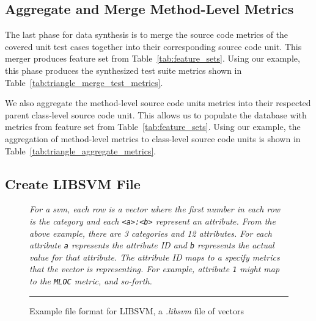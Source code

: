 \subsection{Aggregate and Merge Method-Level Metrics}
\label{subsec:approach_aggregate_merge_metrics}
The last phase for data synthesis is to merge the source code metrics of the covered unit test cases together into their corresponding source code unit. This merger produces feature set  from Table~\ref{tab:feature_sets}. Using our example, this phase produces the synthesized test suite metrics shown in Table~\ref{tab:triangle_merge_test_metrics}.

We also aggregate the method-level source code units metrics into their respected parent class-level source code unit. This allows us to populate the database with metrics from feature set  from Table~\ref{tab:feature_sets}. Using our example, the aggregation of method-level metrics to class-level source code units is shown in Table~\ref{tab:triangle_aggregate_metrics}.


\subsection{Create LIBSVM File}
\label{subsec:approach_create_libsvm_file}
\begin{figure}[!tb]
  \centering
  \begin{minipage}{9.5cm}
    
  \end{minipage}
  \caption{Example file format for LIBSVM, a \emph{.libsvm} file of vectors}
  \vspace{1mm}
  \footnotesize{\emph{For a \gls{svm}, each row is a vector where the first number in each row is the category and each \texttt{<a>:<b>} represent an attribute. From the above example, there are 3 categories and 12 attributes. For each attribute \texttt{a} represents the attribute ID and \texttt{b} represents the actual value for that attribute. The attribute ID maps to a specify metrics that the vector is representing. For example, attribute \texttt{1} might map to the \texttt{MLOC} metric, and so-forth.}}
  \vspace{2mm}
  \hrule
  \label{fig:libsvm_file}
\end{figure}

